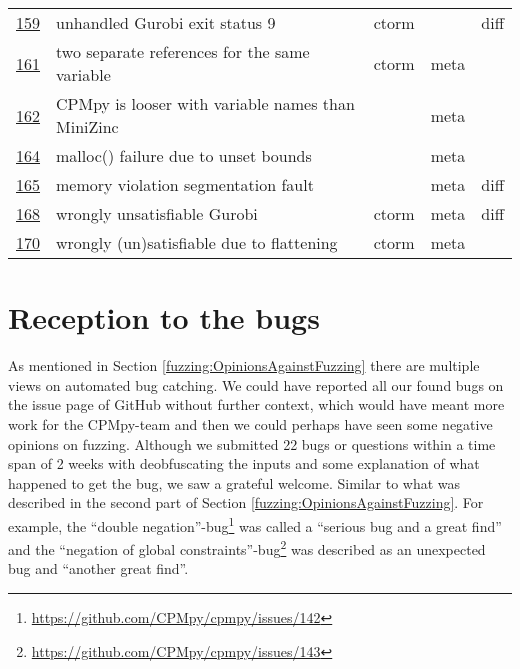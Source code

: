 \begin{table}[]
\begin{tabular}{lllll}
		\href{https://github.com/CPMpy/cpmpy/issues/159}{159} & unhandled Gurobi exit status 9                    & ctorm &       & diff \\
		\href{https://github.com/CPMpy/cpmpy/issues/161}{161} & two separate references for the same variable     & ctorm & meta  &      \\
		\href{https://github.com/CPMpy/cpmpy/issues/162}{162} & CPMpy is looser with variable names than MiniZinc &       & meta  &      \\
		\href{https://github.com/CPMpy/cpmpy/issues/164}{164} & malloc() failure due to unset bounds              &       & meta  &      \\
		\href{https://github.com/CPMpy/cpmpy/issues/165}{165} & memory violation segmentation fault               &       & meta  & diff \\
		\href{https://github.com/CPMpy/cpmpy/issues/168}{168} & wrongly unsatisfiable Gurobi                      & ctorm & meta  & diff \\
		\href{https://github.com/CPMpy/cpmpy/issues/170}{170} & wrongly (un)satisfiable due to flattening         & ctorm & meta  &      \\ \bottomrule
	\end{tabular}
\end{table}


\section{Reception to the bugs} 
\label{res:ReceptionToBug}
As mentioned in Section \ref{fuzzing:OpinionsAgainstFuzzing} there are multiple views on automated bug catching. We could have reported all our found bugs on the issue page of GitHub without further context, which would have meant more work for the CPMpy-team and then we could perhaps have seen some negative opinions on fuzzing. 
Although we submitted 22 bugs or questions within a time span of 2 weeks with deobfuscating the inputs and some explanation of what happened to get the bug, we saw a grateful welcome. Similar to what was described in the second part of Section \ref{fuzzing:OpinionsAgainstFuzzing}. 
For example, the “double negation”-bug\footnote{\url{https://github.com/CPMpy/cpmpy/issues/142}} was called a “serious bug and a great find” and 
the “negation of global constraints”-bug\footnote{\url{https://github.com/CPMpy/cpmpy/issues/143}} was described as an unexpected bug and “another great find”.

